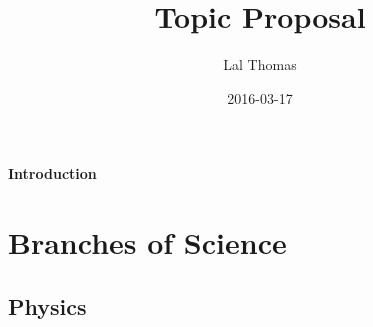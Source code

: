 \documentclass{article}
\begin{document}
\title{Topic Proposal}
\date{2016-03-17}
\author{ Lal Thomas}
\maketitle
\newpage
\paragraph{Introduction}
\section{Branches of Science}
\subsection{Physics}
\end{document}
